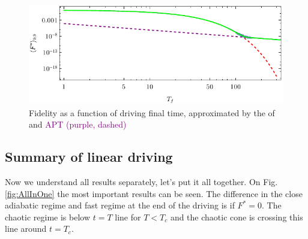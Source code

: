 \begin{figure}[H]
    \centering 
    \includegraphics[scale=1.2]{../img/landauCompare.pdf}
    \caption{Fidelity as a function of driving final time, approximated by the  of  and \textcolor{purple}{APT (purple, dashed)}}
    \label{fig:landauCompare}
\end{figure}




\subsection{Summary of linear driving}
Now we understand all results separately, let's put it all together. On Fig. \ref{fig:AllInOne} the most important results can be seen. The difference in the close adiabatic regime and fast regime at the end of the driving is if $F^*=0$. The chaotic regime is below $t=T$ line for $T<T_c$ and the chaotic cone is crossing this line around $t=T_c$.

